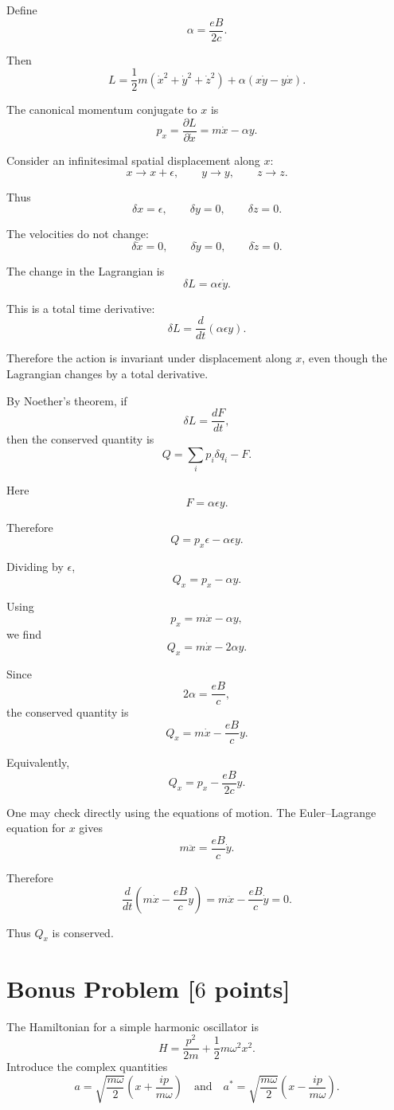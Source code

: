 \documentclass[11pt, a4paper]{article} %
\begin{document}
Define
\[
\alpha=\frac{eB}{2c}.
\]

Then
\[
L
=
\frac12 m(\dot x^2+\dot y^2+\dot z^2)
+
\alpha(x\dot y-y\dot x).
\]

The canonical momentum conjugate to \(x\) is
\[
p_x=\frac{\partial L}{\partial \dot x}
=
m\dot x-\alpha y.
\]

Consider an infinitesimal spatial displacement along \(x\):
\[
x\to x+\epsilon,
\qquad
y\to y,
\qquad
z\to z.
\]

Thus
\[
\delta x=\epsilon,
\qquad
\delta y=0,
\qquad
\delta z=0.
\]

The velocities do not change:
\[
\delta\dot x=0,
\qquad
\delta\dot y=0,
\qquad
\delta\dot z=0.
\]

The change in the Lagrangian is
\[
\delta L
=
\alpha\epsilon \dot y.
\]

This is a total time derivative:
\[
\delta L
=
\frac{d}{dt}(\alpha\epsilon y).
\]

Therefore the action is invariant under displacement along \(x\), even though the Lagrangian changes by a total derivative.

By Noether's theorem, if
\[
\delta L=\frac{dF}{dt},
\]
then the conserved quantity is
\[
Q=\sum_i p_i\delta q_i-F.
\]

Here
\[
F=\alpha\epsilon y.
\]

Therefore
\[
Q
=
p_x\epsilon-\alpha\epsilon y.
\]

Dividing by \(\epsilon\),
\[
Q_x=p_x-\alpha y.
\]

Using
\[
p_x=m\dot x-\alpha y,
\]
we find
\[
Q_x
=
m\dot x-2\alpha y.
\]

Since
\[
2\alpha=\frac{eB}{c},
\]
the conserved quantity is
\[
\boxed{
Q_x
=
m\dot x-\frac{eB}{c}y.
}
\]

Equivalently,
\[
\boxed{
Q_x=p_x-\frac{eB}{2c}y.
}
\]

One may check directly using the equations of motion. The Euler--Lagrange equation for \(x\) gives
\[
m\ddot x=\frac{eB}{c}\dot y.
\]

Therefore
\[
\frac{d}{dt}
\left(
m\dot x-\frac{eB}{c}y
\right)
=
m\ddot x-\frac{eB}{c}\dot y
=0.
\]

Thus \(Q_x\) is conserved.


\newpage
\section*{Bonus Problem [$6$ points]}
The Hamiltonian for a simple harmonic oscillator is
\[
H=\frac{p^2}{2m}+\frac{1}{2}m\omega^2 x^2.
\]
Introduce the complex quantities
\[
a=\sqrt{\frac{m\omega}{2}}\left(x+\frac{i p}{m\omega}\right) \quad \text{and} \quad a^*=\sqrt{\frac{m\omega}{2}}\left(x-\frac{i p}{m\omega}\right).
\]
\end{document}
